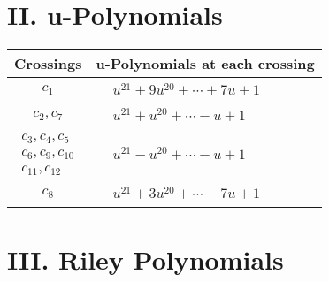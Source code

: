 \documentclass[1p]{elsarticle_modified}
\theoremstyle{definition}
\begin{document}
\newpage\renewcommand{\arraystretch}{1}
\centering \section*{ II. u-Polynomials}
\begin{tabular}{m{50pt}|m{274pt}}
Crossings & \hspace{64pt}u-Polynomials at each crossing \\
\hline $$\begin{aligned}c_{1}\end{aligned}$$&$\begin{aligned}
&u^{21}+9 u^{20}+\cdots+7 u+1
\end{aligned}$\\
\hline $$\begin{aligned}c_{2},c_{7}\end{aligned}$$&$\begin{aligned}
&u^{21}+u^{20}+\cdots- u+1
\end{aligned}$\\
\hline $$\begin{aligned}c_{3},c_{4},c_{5}\\c_{6},c_{9},c_{10}\\c_{11},c_{12}\end{aligned}$$&$\begin{aligned}
&u^{21}- u^{20}+\cdots- u+1
\end{aligned}$\\
\hline $$\begin{aligned}c_{8}\end{aligned}$$&$\begin{aligned}
&u^{21}+3 u^{20}+\cdots-7 u+1
\end{aligned}$\\
\hline
\end{tabular}\newpage\renewcommand{\arraystretch}{1}
\centering \section*{ III. Riley Polynomials}
\end{document}
